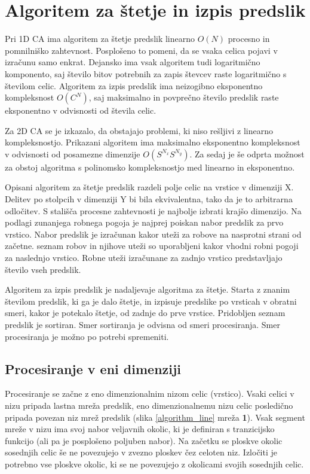 \documentclass[12pt,a4paper,openany,twoside]{book}
\begin{document}
\chapter{Algoritem za štetje in izpis predslik}

Pri 1D CA ima algoritem za štetje predslik linearno \(O(N)\) procesno in pomnilniško zahtevnost.
Posplošeno to pomeni, da se vsaka celica pojavi v izračunu samo enkrat.
Dejansko ima vsak algoritem tudi logaritmično komponento,
saj število bitov potrebnih za zapis števcev raste logaritmično s številom celic.
Algoritem za izpis predslik ima neizogibno eksponentno kompleksnost \(O(C^N)\),
saj maksimalno in povprečno število predslik raste eksponentno
v odvisnosti od števila celic.

Za 2D CA se je izkazalo, da obstajajo problemi, ki niso rešljivi z linearno kompleksnostjo.
Prikazani algoritem ima maksimalno eksponentno kompleksnost
v odvisnosti od posamezne dimenzije \(O(S^{N_x} S^{N_y})\).
Za sedaj je še odprta možnost za obstoj algoritma s polinomsko kompleksnostjo
med linearno in eksponentno.

Opisani algoritem za štetje predslik razdeli polje celic na vrstice v dimenziji X.
Delitev po stolpcih v dimenziji Y bi bila ekvivalentna, tako da je to arbitrarna odločitev.
S stališča procesne zahtevnosti je najbolje izbrati krajšo dimenzijo.
Na podlagi zunanjega robnega pogoja je najprej poiskan nabor predslik za prvo vrstico.
Nabor predslik je izračunan kakor uteži za robove na nasprotni strani od začetne.
seznam robov in njihove uteži so uporabljeni kakor vhodni robni pogoji za naslednjo vrstico.
Robne uteži izračunane za zadnjo vrstico predstavljajo število vseh predslik.

Algoritem za izpis predslik je nadaljevaje algoritma za štetje.
Starta z znanim številom predslik, ki ga je dalo štetje, in izpisuje predslike
po vrsticah v obratni smeri, kakor je potekalo štetje, od zadnje do prve vrstice.
Pridobljen seznam predslik je sortiran. Smer sortiranja je odvisna od smeri procesiranja.
Smer procesiranja je možno po potrebi spremeniti.

\section{Procesiranje v eni dimenziji}

Procesiranje se začne z eno dimenzionalnim nizom celic (vrstico).
Vsaki celici v nizu pripada lastna mreža predslik, eno dimenzionalnemu nizu celic
posledično pripada povezan niz mrež predslik (slika \ref{algorithm_line} mreža \textbf{1}).
Vsak segment mreže v nizu ima svoj nabor veljavnih okolic,
ki je definiran s tranzicijsko funkcijo (ali pa je posplošeno poljuben nabor).
Na začetku se ploskve okolic sosednjih celic še ne povezujejo v
zvezno ploskev čez celoten niz. Izločiti je potrebno vse ploskve okolic,
ki se ne povezujejo z okolicami svojih sosednjih celic.
\end{document}
